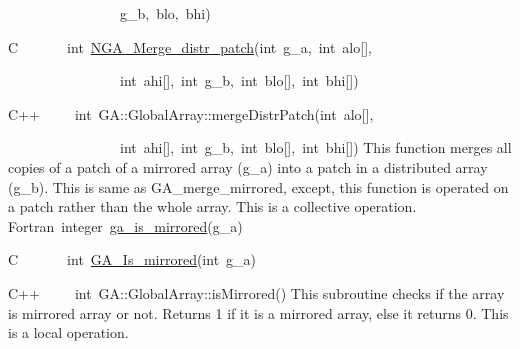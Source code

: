 ~~~~~~~~~~~~~~~~g\_b,~blo,~bhi)~

C~~~~~~~int~\href{http://www.emsl.pnl.gov/docs/global/c_nga_ops.html\#GA_MERGE_DISTR_PATCH}{NGA\_{}Merge\_{}distr\_{}patch}(int~g\_a,~int~alo{[}{]},~

~~~~~~~~~~~~~~~~int~ahi{[}{]},~int~g\_b,~int~blo{[}{]},~int~bhi{[}{]})~

C++~~~~~int~GA::GlobalArray::mergeDistrPatch(int~alo{[}{]},~

~~~~~~~~~~~~~~~~int~ahi{[}{]},~int~g\_b,~int~blo{[}{]},~int~bhi{[}{]})
This function merges all copies of a patch of a mirrored array (g\_a)
into a patch in a distributed array (g\_b). This is same as GA\_merge\_mirrored,
except, this function is operated on a patch rather than the whole
array. This is a collective operation.
Fortran~integer~\href{http://www.emsl.pnl.gov/docs/global/ga_ops.html\#ga_is_mirrored}{ga\_{}is\_{}mirrored}(g\_a)~

C~~~~~~~int~\href{http://www.emsl.pnl.gov/docs/global/c_nga_ops.html\#ga_is_mirrored}{GA\_{}Is\_{}mirrored}(int~g\_a)~

C++~~~~~int~GA::GlobalArray::isMirrored()
This subroutine checks if the array is mirrored array or not. Returns
1 if it is a mirrored array, else it returns 0. This is a local operation. 

